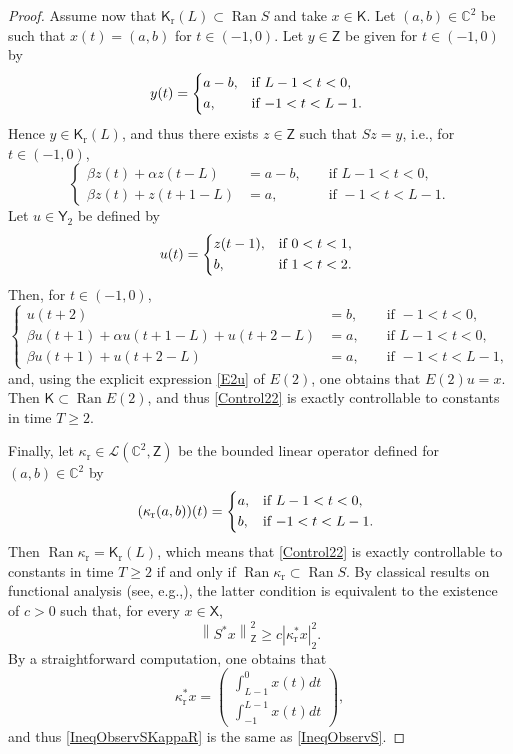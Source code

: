 \documentclass[10pt]{article}
\newcommand{\ie}{i.e.,\xspace}
\newcommand{\eg}{e.g.,\xspace}
\renewcommand{\eg}{e.g.,\xspace}
\theoremstyle{plain}
\theoremstyle{definition}
\DeclareMathOperator{\range}{Ran}
\newcommand{\norm}[1]{\left\lVert #1\right\lVert}
\newcommand{\abs}[1]{\left\lvert #1\right \rvert}
\numberwithin{equation}{section}\numberwithin{figure}{section}\emergencystretch=3em
\begin{document}
\begin{proof}
Assume now that $\mathsf K_{\mathrm r}(L) \subset \range S$ and take $x \in \mathsf K$. Let $(a, b) \in \mathbb C^2$ be such that $x(t) = (a, b)$ for $t \in (-1, 0)$. Let $y \in \mathsf Z$ be given for $t \in (-1, 0)$ by
\[
y(t) = \begin{dcases*}
a - b, & if $L - 1 < t < 0$, \\
a, & if $-1 < t < L - 1$.
\end{dcases*}
\]
Hence $y \in \mathsf K_{\mathrm r}(L)$, and thus there exists $z \in \mathsf Z$ such that $S z = y$, \ie for $t \in (-1, 0)$,
\[
\left\{
\begin{aligned}
\beta z(t) + \alpha z(t - L) & = a - b, & & \text{ if } L - 1 < t < 0, \\
\beta z(t) + z(t + 1 - L) & = a, & & \text{ if } -1 < t < L - 1.
\end{aligned}
\right.
\]
Let $u \in \mathsf Y_2$ be defined by
\[
u(t) =
\begin{dcases*}
z(t - 1), & if $0 < t < 1$, \\
b, & if $1 < t < 2$.
\end{dcases*}
\]
Then, for $t \in (-1, 0)$,
\[
\left\{
\begin{aligned}
u(t + 2) & = b, & & \text{ if } -1 < t < 0, \\
\beta u(t + 1) + \alpha u(t + 1 - L) + u(t + 2 - L) & = a, & & \text{ if } L - 1 < t < 0, \\
\beta u(t + 1) + u(t + 2 - L) & = a, & & \text{ if } -1 < t < L - 1,
\end{aligned}
\right.
\]
and, using the explicit expression \eqref{E2u} of $E(2)$, one obtains that $E(2) u = x$. Then $\mathsf K \subset \range E(2)$, and thus \eqref{Control22} is exactly controllable to constants in time $T \geq 2$.

Finally, let $\kappa_{\mathrm r} \in \mathcal L(\mathbb C^2, \mathsf Z)$ be the bounded linear operator defined for $(a, b) \in \mathbb C^2$ by
\[
(\kappa_{\mathrm r} (a, b)) (t) =
\begin{dcases*}
a, & if $L - 1 < t < 0$, \\
b, & if $-1 < t < L - 1$.
\end{dcases*}
\]
Then $\range \kappa_{\mathrm r} = \mathsf K_{\mathrm r}(L)$, which means that \eqref{Control22} is exactly controllable to constants in time $T \geq 2$ if and only if $\range \kappa_{\mathrm r} \subset \range S$. By classical results on functional analysis (see, \eg \cite[Lem.\,2.48]{Coron2007Control}), the latter condition is equivalent to the existence of $c > 0$ such that, for every $x \in \mathsf X$,
\begin{equation}
\label{IneqObservSKappaR}
\norm{S^\ast x}_{\mathsf Z}^2 \geq c \abs{\kappa_{\mathrm r}^\ast x}_2^2.
\end{equation}
By a straightforward computation, one obtains that
\[
\kappa_{\mathrm r}^\ast x =
\left(
\begin{aligned}
\textstyle\int_{L-1}^0 x(t) dt \\
\textstyle\int_{-1}^{L-1} x(t) dt
\end{aligned}
\right),
\]
and thus \eqref{IneqObservSKappaR} is the same as \eqref{IneqObservS}.
\end{proof}
\end{document}
